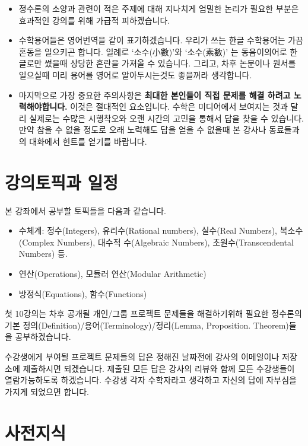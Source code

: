 \documentclass[a4paper, 11pt]{report}
\renewcommand{\<}{\langle}
\renewcommand{\>}{\rangle}
\begin{document}
\begin{itemize}
  \item 정수론의 소양과 관련이 적은 주제에 대해 지나치게 엄밀한 논리가 
  필요한 부분은 효과적인 강의를 위해 가급적 피하겠습니다.
  \item 수학용어들은 영어번역을 같이 표기하겠습니다. 우리가 쓰는 한글 
  수학용어는 가끔 혼동을 일으키곤 합니다. 일례로 ‘소수(小數)’와 ‘소수(素數)’
  는 동음이의어로 한글로만 썼을때 상당한 혼란을 가져올 수 있습니다. 그리고, 
  차후 논문이나 원서를 일으실때 미리 용어를 영어로 알아두시는것도 좋을꺼라 
  생각합니다.
  \item 마지막으로 가장 중요한 주의사항은 \textbf{최대한 본인들이 직접 문제를 해결
  하려고 노력해야합니다.} 이것은 절대적인 요소입니다. 수학은 미디어에서 보여지는 것과 
  달리 실제로는 수많은 시행착오와 오랜 시간의 고민을 통해서 답을 찾을 수 있습니다. 
  만약 참을 수 없을 정도로 오래 노력해도 답을 얻을 수 없을때 본 강사나 동료들과의 
  대화에서 힌트를 얻기를 바랍니다.
\end{itemize}

\section{강의토픽과 일정}

본 강좌에서 공부할 토픽들을 다음과 같습니다.

\begin{itemize}
  \item 수체계: 정수(Integers), 유리수(Rational numbers), 실수(Real Numbers), 
  복소수(Complex Numbers), 대수적 수(Algebraic Numbers), 
  초원수(Transcendental Numbers) 등.
  \item 연산(Operations), 모듈러 연산(Modular Arithmetic)
  \item 방정식(Equations), 함수(Functions)
\end{itemize}

첫 10강의는 차후 공개될 개인/그룹 프로젝트 문제들을 해결하기위해 필요한 정수론의 기본 
정의(Definition)/용어(Terminology)/정리(Lemma, Proposition. Theorem)들을 
공부하겠습니다.

수강생에게 부여될 프로젝트 문제들의 답은 정해진 날짜전에 강사의 이메일이나 저장소에
제출하시면 되겠습니다. 제출된 모든 답은 강사의 리뷰와 함께 모든 수강생들이 열람가능하도록 
하겠습니다. 수강생 각자 수학자라고 생각하고 자신의 답에 자부심을 가지게 되었으면 
합니다. 

\section{사전지식}
\end{document}
